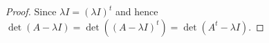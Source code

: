 \begin{Exercise}
\begin{proof}
Since $\lambda I = (\lambda I)^t$ and hence $\det(A-\lambda I) = \det( (A-\lambda I)^t ) = \det(A^t -\lambda I)$.
\end{proof}
\end{Exercise}